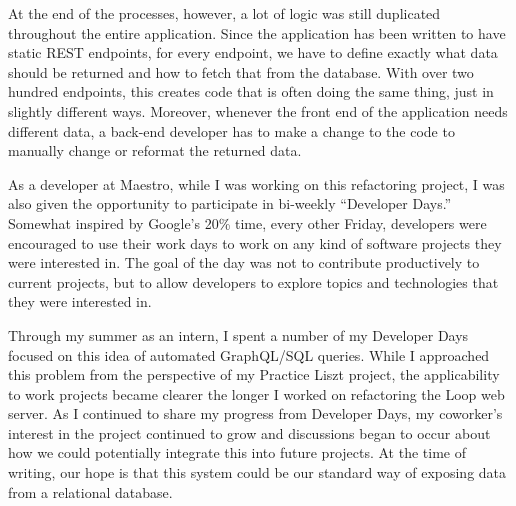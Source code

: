 At the end of the processes, however, a lot of logic was still duplicated throughout the entire application.  Since the application has been written to have static REST endpoints, for every endpoint, we have to define exactly what data should be returned and how to fetch that from the database. With over two hundred endpoints, this creates code that is often doing the same thing, just in slightly different ways.  Moreover, whenever the front end of the application needs different data, a back-end developer has to make a change to the code to manually change or reformat the returned data.

As a developer at Maestro, while I was working on this refactoring project, I was also given the opportunity to participate in bi-weekly ``Developer Days.''  Somewhat inspired by Google's 20\% time, every other Friday, developers were encouraged to use their work days to work on any kind of software projects they were interested in.  The goal of the day was not to contribute productively to current projects, but to allow developers to explore topics and technologies that they were interested in.

Through my summer as an intern, I spent a number of my Developer Days focused on this idea of automated GraphQL/SQL queries. While I approached this problem from the perspective of my Practice Liszt project, the applicability to work projects became clearer the longer I worked on refactoring the Loop web server.  As I continued to share my progress from Developer Days, my coworker's interest in the project continued to grow and discussions began to occur about how we could potentially integrate this into future projects.  At the time of writing, our hope is that this system could be our standard way of exposing data from a relational database.
